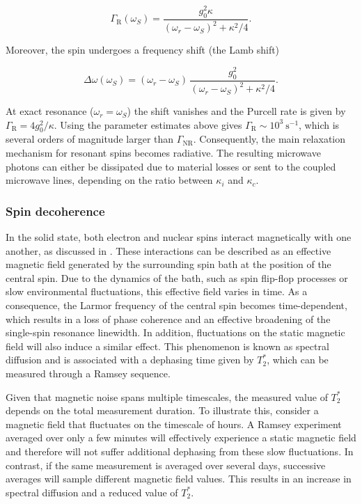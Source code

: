 \begin{equation}
\label{eq:Purcell_formula}
    \Gamma_\text{R}(\omega_S) = \frac{g_0^2\kappa}{(\omega_r-\omega_S)^2 + \kappa^2/4}.
\end{equation}

Moreover, the spin undergoes a frequency shift (the Lamb shift)

\begin{equation}
\Delta\omega(\omega_S) = (\omega_r-\omega_S)\, \frac{g_0^2}{(\omega_r-\omega_S)^2 + \kappa^2/4}.
\end{equation}

At exact resonance ($\omega_r=\omega_S$) the shift vanishes and the Purcell rate is given by $\Gamma_\text{R}=4g_0^2/\kappa$. Using the parameter estimates above gives $\Gamma_\text{R}\sim10^3\ \mathrm{s}^{-1}$, which is several orders of magnitude larger than $\Gamma_\text{NR}$. Consequently, the main relaxation mechanism for resonant \Er spins becomes radiative. The resulting microwave photons can either be dissipated due to material losses or sent to the coupled microwave lines, depending on the ratio between $\kappa_i$ and $\kappa_c$.

\subsubsection{Spin decoherence}

In the solid state, both electron and nuclear spins interact magnetically with one another, as discussed in . These interactions can be described as an effective magnetic field generated by the surrounding spin bath at the position of the central spin. Due to the dynamics of the bath, such as spin flip-flop processes or slow environmental fluctuations, this effective field varies in time.  As a consequence, the Larmor frequency of the central spin becomes time-dependent, which results in a loss of phase coherence and an effective broadening of the single-spin resonance linewidth. In addition, fluctuations on the static magnetic field will also induce a similar effect. This phenomenon is known as spectral diffusion and is associated with a dephasing time given by $T_2^*$, which can be measured through a Ramsey sequence. 

Given that magnetic noise spans multiple timescales, the measured value of $T_2^*$ depends on the total measurement duration. To illustrate this, consider a magnetic field that fluctuates on the timescale of hours. A Ramsey experiment averaged over only a few minutes will effectively experience a static magnetic field and therefore will not suffer additional dephasing from these slow fluctuations. In contrast, if the same measurement is averaged over several days, successive averages will sample different magnetic field values. This results in an increase in spectral diffusion and a reduced value of $T_2^*$.

